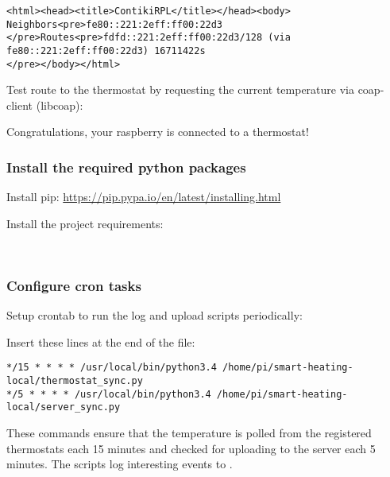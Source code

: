 \noindent
\begin{minipage}{\linewidth}
\begin{lstlisting}[numbers=none]
<html><head><title>ContikiRPL</title></head><body>
Neighbors<pre>fe80::221:2eff:ff00:22d3
</pre>Routes<pre>fdfd::221:2eff:ff00:22d3/128 (via fe80::221:2eff:ff00:22d3) 16711422s
</pre></body></html>
\end{lstlisting}
\end{minipage}

Test route to the thermostat by requesting the current temperature via
coap-client (libcoap):


Congratulations, your raspberry is connected to a thermostat!

\subsubsection{Install the required python packages}\label{install-the-required-python-packages}

Install pip: \url{https://pip.pypa.io/en/latest/installing.html}

\noindent
Install the project requirements:

\noindent
{}\\

\subsubsection{Configure cron tasks}

Setup crontab to run the log and upload scripts periodically:

{}

Insert these lines at the end of the file:

\noindent
\begin{minipage}{\linewidth}
\begin{lstlisting}
*/15 * * * * /usr/local/bin/python3.4 /home/pi/smart-heating-local/thermostat_sync.py
*/5 * * * * /usr/local/bin/python3.4 /home/pi/smart-heating-local/server_sync.py
\end{lstlisting}
\end{minipage}

These commands ensure that the temperature is polled from the registered
thermostats each 15 minutes and checked for uploading to the server each
5 minutes. The scripts log interesting events to
.


